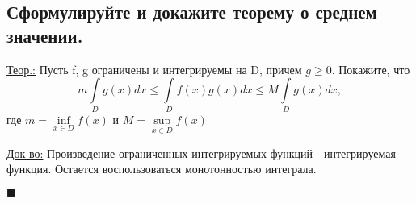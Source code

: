 
\subsection{Сформулируйте и докажите теорему о среднем значении.}
\underline{Теор.:} 
    Пусть f, g ограничены и интегрируемы на D, причем $g \geq 0$. Покажите, что \[ m \int\limits_{D}g(x)dx \leq \int\limits_{D}f(x)g(x)dx \leq M \int\limits_{D}g(x)dx,\]
    где $m = \inf\limits_{x\in D}f(x)$ и $M = \sup\limits_{x \in D}f(x)$

\underline{Док-во:} 
    Произведение ограниченных интегрируемых функций - интегрируемая функция. Остается воспользоваться монотонностью интеграла.
    \begin{flushright}
    $\blacksquare$
    \end{flushright}

